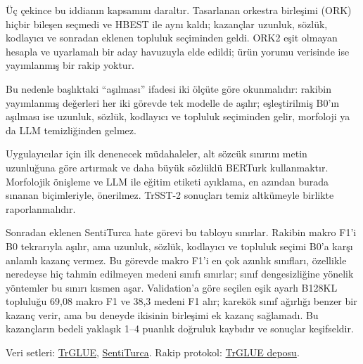 \documentclass[11pt]{article}
\begin{document}
Üç çekince bu iddianın kapsamını daraltır. Tasarlanan orkestra birleşimi (ORK) hiçbir bileşen seçmedi ve HBEST ile aynı kaldı; kazançlar uzunluk, sözlük, kodlayıcı ve sonradan eklenen topluluk seçiminden geldi. ORK2 eşit olmayan hesapla ve uyarlamalı bir aday havuzuyla elde edildi; ürün yorumu verisinde ise yayımlanmış bir rakip yoktur.

Bu nedenle başlıktaki ``aşılması'' ifadesi iki ölçüte göre okunmalıdır: rakibin yayımlanmış değerleri her iki görevde tek modelle de aşılır; eşleştirilmiş B0'ın aşılması ise uzunluk, sözlük, kodlayıcı ve topluluk seçiminden gelir, morfoloji ya da LLM temizliğinden gelmez.

Uygulayıcılar için ilk denenecek müdahaleler, alt sözcük sınırını metin uzunluğuna göre artırmak ve daha büyük sözlüklü BERTurk kullanmaktır. Morfolojik önişleme ve LLM ile eğitim etiketi ayıklama, en azından burada sınanan biçimleriyle, önerilmez. TrSST-2 sonuçları temiz altkümeyle birlikte raporlanmalıdır.

Sonradan eklenen SentiTurca hate görevi bu tabloyu sınırlar. Rakibin makro F1'i B0 tekrarıyla aşılır, ama uzunluk, sözlük, kodlayıcı ve topluluk seçimi B0'a karşı anlamlı kazanç vermez. Bu görevde makro F1'i en çok azınlık sınıfları, özellikle neredeyse hiç tahmin edilmeyen medeni sınıfı sınırlar; sınıf dengesizliğine yönelik yöntemler bu sınırı kısmen aşar. Validation'a göre seçilen eşik ayarlı B128KL topluluğu 69,08 makro F1 ve 38,3 medeni F1 alır; karekök sınıf ağırlığı benzer bir kazanç verir, ama bu deneyde ikisinin birleşimi ek kazanç sağlamadı. Bu kazançların bedeli yaklaşık 1–4 puanlık doğruluk kaybıdır ve sonuçlar keşifseldir.

Veri setleri: \href{https://huggingface.co/datasets/turkish-nlp-suite/TrGLUE}{TrGLUE}, \href{https://huggingface.co/datasets/turkish-nlp-suite/SentiTurca}{SentiTurca}. Rakip protokol: \href{https://github.com/turkish-nlp-suite/TrGLUE}{TrGLUE deposu}.


\end{document}
